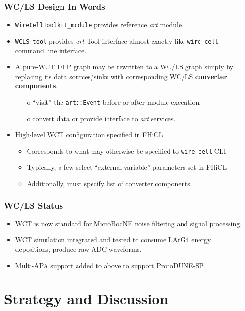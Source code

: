 \documentclass[xcolor=dvipsnames]{beamer}
\begin{document}
\begin{frame}
  \frametitle{WC/LS Design In Words}
  \begin{itemize}
  \item \texttt{WireCellToolkit\_module} provides reference \textit{art} module.
  \item \texttt{WCLS\_tool} provides \textit{art} Tool interface almost exactly like \texttt{wire-cell} command line interface.
  \item A pure-WCT DFP graph may be rewritten to a WC/LS graph simply by replacing its data sources/sinks with corresponding WC/LS \textbf{converter components}.
    \begin{itemize}\footnotesize
    \item[o] ``visit'' the \texttt{art::Event} before or after module execution.
    \item[o] convert data or provide interface to \textit{art} services.
    \end{itemize}
  \item High-level WCT configuration specified in FHiCL 
    \begin{itemize}\footnotesize
    \item Corresponds to what may otherwise be specified to \texttt{wire-cell} CLI
    \item Typically, a few select ``external variable'' parameters set in FHiCL
    \item Additionally, must specify list of converter components.
    \end{itemize}
  \end{itemize}
\end{frame}


\begin{frame}
  \frametitle{WC/LS Status}
  \begin{itemize}
  \item WCT is now standard for MicroBooNE noise filtering and signal processing.
  \item WCT simulation integrated and tested to consume LArG4 energy depositions, produce raw ADC waveforms.
  \item Multi-APA support added to above to support ProtoDUNE-SP.
  \end{itemize}
\end{frame}

\section{Strategy and Discussion}
\begin{frame}
\end{frame}
\end{document}
